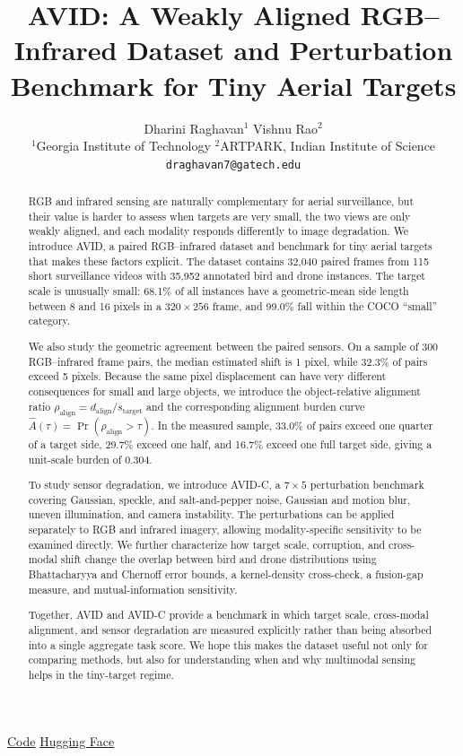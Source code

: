 \documentclass[10pt]{article}
\title{\vspace{-1.2em}\textbf{AVID: A Weakly Aligned RGB--Infrared Dataset and Perturbation Benchmark for Tiny Aerial Targets}}
\author{
Dharini Raghavan$^{1}$ \quad Vishnu Rao$^{2}$\\[3pt]
\small $^1$Georgia Institute of Technology \qquad $^2$ARTPARK, Indian Institute of Science\\
\small \texttt{draghavan7@gatech.edu}
}
\date{}
\newcommand{\codeurl}{https://github.com/rdharini2001/ICIP_2025_Data_Release}
\newcommand{\dataurl}{https://huggingface.co/datasets/Dharini24/AVID}
\newcommand{\dataset}{\textsc{AVID}}
\newcommand{\corrupt}{\textsc{AVID-C}}
\newcommand{\rhomis}{\rho_{\mathrm{align}}}
\newcommand{\burden}{\widehat A}
\begin{document}
\maketitle

\vspace{-0.7em}
\begin{center}
\small
{\color{linkblue}\faGithub}\;\href{\codeurl}{Code}
\qquad
{\color{linkgold}\faSmileBeam}\;\href{\dataurl}{Hugging Face}
\end{center}
\vspace{-0.3em}

\begin{abstract}
RGB and infrared sensing are naturally complementary for aerial surveillance, but their value is harder to assess when targets are very small, the two views are only weakly aligned, and each modality responds differently to image degradation. We introduce \dataset{}, a paired RGB--infrared dataset and benchmark for tiny aerial targets that makes these factors explicit. The dataset contains 32,040 paired frames from 115 short surveillance videos with 35,952 annotated bird and drone instances. The target scale is unusually small: 68.1\% of all instances have a geometric-mean side length between 8 and 16 pixels in a $320\times256$ frame, and 99.0\% fall within the COCO ``small'' category.

We also study the geometric agreement between the paired sensors. On a sample of 300 RGB--infrared frame pairs, the median estimated shift is 1 pixel, while 32.3\% of pairs exceed 5 pixels. Because the same pixel displacement can have very different consequences for small and large objects, we introduce the object-relative alignment ratio
$\rhomis=d_{\mathrm{align}}/s_{\mathrm{target}}$
and the corresponding alignment burden curve
$\burden(\tau)=\Pr(\rhomis>\tau)$.
In the measured sample, 33.0\% of pairs exceed one quarter of a target side, 29.7\% exceed one half, and 16.7\% exceed one full target side, giving a unit-scale burden of 0.304.

To study sensor degradation, we introduce \corrupt{}, a $7\times5$ perturbation benchmark covering Gaussian, speckle, and salt-and-pepper noise, Gaussian and motion blur, uneven illumination, and camera instability. The perturbations can be applied separately to RGB and infrared imagery, allowing modality-specific sensitivity to be examined directly. We further characterize how target scale, corruption, and cross-modal shift change the overlap between bird and drone distributions using Bhattacharyya and Chernoff error bounds, a kernel-density cross-check, a fusion-gap measure, and mutual-information sensitivity.

Together, \dataset{} and \corrupt{} provide a benchmark in which target scale, cross-modal alignment, and sensor degradation are measured explicitly rather than being absorbed into a single aggregate task score. We hope this makes the dataset useful not only for comparing methods, but also for understanding when and why multimodal sensing helps in the tiny-target regime.
\end{abstract}
\end{document}
